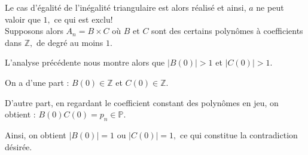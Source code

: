 Le cas d'égalité de l'inégalité triangulaire est alors réalisé et ainsi, $a$ ne peut valoir que $1,$ ce qui est exclu!\\

Supposons alors $A_{n}=B\times C$ où $B$ et $C$ sont des certains polynômes à coefficients dans $\mathbb{Z},$ de degré au moins $1.$

L'analyse précédente nous montre alors que $\vert B(0) \vert >1$ et $\vert C(0) \vert >1.$

On a d'une part : $B(0)\in \mathbb{Z}$ et $C(0)\in \mathbb{Z}.$ 

D'autre part, en regardant le coefficient constant des polynômes en jeu, on obtient :  $B(0)C(0)=p_{n}\in \mathbb{P}.$

Ainsi, on obtient $\vert B(0) \vert=1$ ou $\vert C(0)\vert =1,$ ce qui constitue la contradiction désirée.


